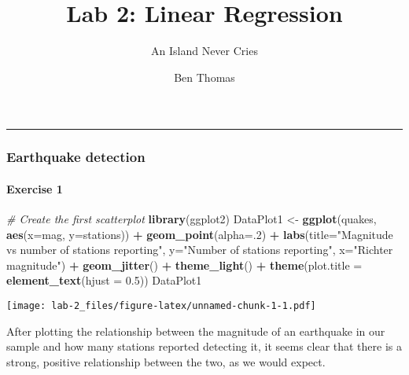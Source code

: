 \documentclass[]{article}
\title{Lab 2: Linear Regression}
\subtitle{An Island Never Cries}
\author{Ben Thomas}
\date{}
\newenvironment{Shaded}{\begin{snugshade}}{\end{snugshade}}
\newcommand{\KeywordTok}[1]{\textcolor[rgb]{0.13,0.29,0.53}{\textbf{#1}}}
\newcommand{\DataTypeTok}[1]{\textcolor[rgb]{0.13,0.29,0.53}{#1}}
\newcommand{\DecValTok}[1]{\textcolor[rgb]{0.00,0.00,0.81}{#1}}
\newcommand{\FloatTok}[1]{\textcolor[rgb]{0.00,0.00,0.81}{#1}}
\newcommand{\StringTok}[1]{\textcolor[rgb]{0.31,0.60,0.02}{#1}}
\newcommand{\CommentTok}[1]{\textcolor[rgb]{0.56,0.35,0.01}{\textit{#1}}}
\newcommand{\OperatorTok}[1]{\textcolor[rgb]{0.81,0.36,0.00}{\textbf{#1}}}
\newcommand{\NormalTok}[1]{#1}
\let\oldparagraph\paragraph
\renewcommand{\paragraph}[1]{\oldparagraph{#1}\mbox{}}
\begin{document}
\maketitle

\begin{center}\rule{0.5\linewidth}{\linethickness}\end{center}

\subsubsection{Earthquake detection}\label{earthquake-detection}

\paragraph{Exercise 1}\label{exercise-1}

\begin{Shaded}
\begin{Highlighting}[]
\CommentTok{# Create the first scatterplot }
\KeywordTok{library}\NormalTok{(ggplot2)}
\NormalTok{DataPlot1 <-}\StringTok{ }\KeywordTok{ggplot}\NormalTok{(quakes, }\KeywordTok{aes}\NormalTok{(}\DataTypeTok{x=}\NormalTok{mag, }\DataTypeTok{y=}\NormalTok{stations)) }\OperatorTok{+}\StringTok{ }\KeywordTok{geom_point}\NormalTok{(}\DataTypeTok{alpha=}\NormalTok{.}\DecValTok{2}\NormalTok{) }\OperatorTok{+}
\StringTok{  }\KeywordTok{labs}\NormalTok{(}\DataTypeTok{title=}\StringTok{"Magnitude vs number of stations reporting"}\NormalTok{, }
         \DataTypeTok{y=}\StringTok{"Number of stations reporting"}\NormalTok{, }\DataTypeTok{x=}\StringTok{"Richter magnitude"}\NormalTok{) }\OperatorTok{+}
\StringTok{  }\KeywordTok{geom_jitter}\NormalTok{() }\OperatorTok{+}
\StringTok{  }\KeywordTok{theme_light}\NormalTok{() }\OperatorTok{+}\StringTok{ }\KeywordTok{theme}\NormalTok{(}\DataTypeTok{plot.title =} \KeywordTok{element_text}\NormalTok{(}\DataTypeTok{hjust =} \FloatTok{0.5}\NormalTok{)) }
\NormalTok{DataPlot1}
\end{Highlighting}
\end{Shaded}

\texttt{[image: lab-2\_files/figure-latex/unnamed-chunk-1-1.pdf]}

After plotting the relationship between the magnitude of an earthquake
in our sample and how many stations reported detecting it, it seems
clear that there is a strong, positive relationship between the two, as
we would expect.

\newpage
\end{document}
